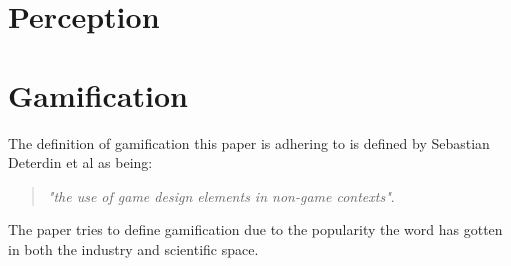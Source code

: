 \section{Perception}






\section{Gamification}
    The definition of gamification this paper is adhering to is defined by Sebastian Deterdin et al as being: \begin{quote}
        \textit{"the use of game design elements in non-game contexts"}\cite{gamification}.\\
    \end{quote}
    The paper tries to define gamification due to the popularity the word has gotten in both the industry and scientific space\cite{gamification}.
